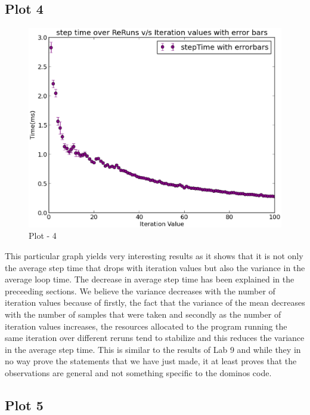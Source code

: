 \documentclass[11pt] {article}
\begin{document}
\subsection{Plot 4}

\begin {figure} [ht]
\begin {center}
\includegraphics[scale = 0.35] {5.eps}
\end {center}
\caption {Plot - 4}
\end {figure}

This particular graph yields very interesting results as it shows that it is not only the average 
step time that drops with iteration values but also the variance in the average loop time. The 
decrease in average step time has been explained in the preceeding sections. We believe the 
variance decreases with the number of iteration values because of firstly, the fact that the 
variance of the mean decreases with the number of samples that were taken and secondly as the
number of iteration values increases, the resources allocated to the program running the same
iteration over different reruns tend to stabilize and this reduces the variance in the average
step time. This is similar to the results of Lab 9 and while they in no way prove the statements
that we have just made, it at least proves that the observations are general and not something
specific to the dominos code.

\subsection{Plot 5}
\end{document}

